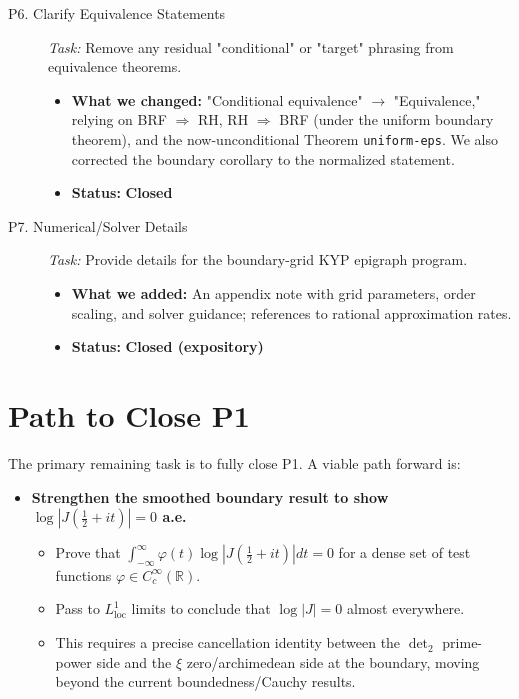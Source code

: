\documentclass[11pt, a4paper]{article}
\newcommand{\status}[2]{\textcolor{#1}{\textbf{#2}}}
\newcommand{\dettwo}{\operatorname{det}_2}
\begin{document}
\begin{description}
    \item[P6. Clarify Equivalence Statements]
    \textit{Task:} Remove any residual "conditional" or "target" phrasing from equivalence theorems.
    \begin{itemize}[leftmargin=*, label={--}]
        \item \textbf{What we changed:} "Conditional equivalence" $\to$ "Equivalence," relying on BRF $\Rightarrow$ RH, RH $\Rightarrow$ BRF (under the uniform boundary theorem), and the now-unconditional Theorem \texttt{uniform-eps}. We also corrected the boundary corollary to the normalized statement.
        \item \textbf{Status:} \status{green!60!black}{Closed}
    \end{itemize}
    
    \item[P7. Numerical/Solver Details]
    \textit{Task:} Provide details for the boundary-grid KYP epigraph program.
    \begin{itemize}[leftmargin=*, label={--}]
        \item \textbf{What we added:} An appendix note with grid parameters, order scaling, and solver guidance; references to rational approximation rates.
        \item \textbf{Status:} \status{green!60!black}{Closed (expository)}
    \end{itemize}

\end{description}

\hrulefill

\section*{Path to Close P1}
The primary remaining task is to fully close P1. A viable path forward is:
\begin{itemize}
    \item \textbf{Strengthen the smoothed boundary result to show $\log|J(\frac{1}{2}+it)| = 0$ a.e.}
    \begin{itemize}
        \item Prove that $\int_{-\infty}^{\infty} \varphi(t) \log|J(\frac{1}{2}+it)| dt = 0$ for a dense set of test functions $\varphi \in C_c^\infty(\mathbb{R})$.
        \item Pass to $L^1_{\text{loc}}$ limits to conclude that $\log|J|=0$ almost everywhere.
        \item This requires a precise cancellation identity between the $\dettwo$ prime-power side and the $\xi$ zero/archimedean side at the boundary, moving beyond the current boundedness/Cauchy results.
    \end{itemize}
\end{itemize}
\end{document}

